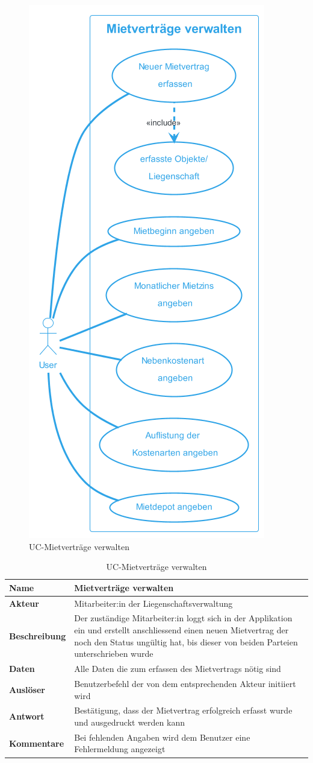 \begin{figure}[H]
  \begin{center}
    \includegraphics[width=0.43\linewidth]{content/diagrams/out/usecase/mietverträgeVerwalten/MietverträgeVerwalten.png}
    \caption{UC-Mietverträge verwalten}
    \label{MietvertraegeVerwalten}
  \end{center}
\end{figure}

\vspace*{-1cm}

  \begin{table}[H]
    \centering
    \settowidth{}
    \setlength\extrarowheight{2pt}
      \begin{tabulary}{1.0\textwidth}{|a|m{14cm}|}
        \hline
        \textbf{Name}& Mietverträge verwalten\\
      \hline
      \textbf{Akteur}& Mitarbeiter:in der Liegenschaftsverwaltung\\
      \hline 
      \textbf{Beschreibung} & Der zuständige Mitarbeiter:in loggt sich in der Applikation ein und erstellt anschliessend einen neuen Mietvertrag der noch den Status ungültig hat, bis dieser von beiden Parteien unterschrieben wurde\\
      \hline
      \textbf{Daten} & Alle Daten die zum erfassen des Mietvertrags nötig sind \\
      \hline
      \textbf{Auslöser} & Benutzerbefehl der von dem entsprechenden Akteur initiiert wird\\
      \hline
      \textbf{Antwort} & Bestätigung, dass der Mietvertrag erfolgreich erfasst wurde und ausgedruckt werden kann\\
      \hline
      \textbf{Kommentare} & Bei fehlenden Angaben wird dem Benutzer eine Fehlermeldung angezeigt\\
      \hline
  \end{tabulary}
  \caption{UC-Mietverträge verwalten}
  \end{table}

